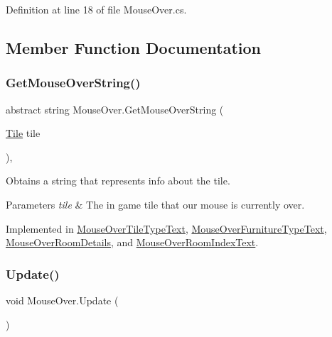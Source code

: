 Definition at line 18 of file Mouse\+Over.\+cs.



\subsection{Member Function Documentation}
\mbox{\label{class_mouse_over_a9878f4e4b19afa1056f4386aa0e67452}} 
\subsubsection{\texorpdfstring{Get\+Mouse\+Over\+String()}{GetMouseOverString()}}
{\footnotesize\ttfamily abstract string Mouse\+Over.\+Get\+Mouse\+Over\+String (\begin{DoxyParamCaption}\item[{\hyperlink{class_tile}{Tile}}]{tile }\end{DoxyParamCaption})\hspace{0.3cm}{\ttfamily [protected]}, {}}



Obtains a string that represents info about the tile. 


\begin{DoxyParams}{Parameters}
{\em tile} & The in game tile that our mouse is currently over.\\
\hline
\end{DoxyParams}


Implemented in \hyperlink{class_mouse_over_tile_type_text_a37c845af19b0857a71a8827058186d9f}{Mouse\+Over\+Tile\+Type\+Text}, \hyperlink{class_mouse_over_furniture_type_text_a651f612de5c73264437f9109e1f7229c}{Mouse\+Over\+Furniture\+Type\+Text}, \hyperlink{class_mouse_over_room_details_aaac2329038d3c038cbf60d82b89b6bd0}{Mouse\+Over\+Room\+Details}, and \hyperlink{class_mouse_over_room_index_text_ac6c8ed4b482cbb570fc8989640d622db}{Mouse\+Over\+Room\+Index\+Text}.

\mbox{\label{class_mouse_over_aa48d29c8e031498d5a4a32e9e290a3e9}} 
\subsubsection{\texorpdfstring{Update()}{Update()}}
{\footnotesize\ttfamily void Mouse\+Over.\+Update (\begin{DoxyParamCaption}{ }\end{DoxyParamCaption})}



